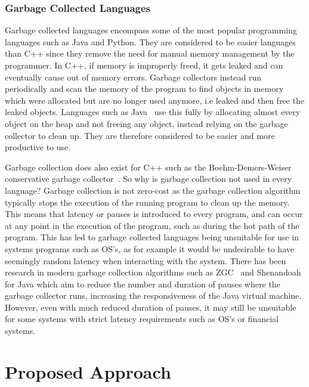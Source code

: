 \documentclass{proposal}
\begin{document}
    \subsubsection{Garbage Collected Languages}

    Garbage collected languages encompass some of the most popular programming languages such as Java and Python.
    They are considered to be easier languages than C++ since they remove the need for manual memory management by the programmer.
    In C++, if memory is improperly freed, it gets leaked and can eventually cause out of memory errors.
    Garbage collectors instead run periodically and scan the memory of the program to find objects in memory which were allocated but are no longer used anymore, i.e leaked and then free the leaked objects.
    Languages such as Java~\cite{Tauro2012} use this fully by allocating almost every object on the heap and not freeing any object, instead relying on the garbage collector to clean up.
    They are therefore considered to be easier and more productive to use.

    Garbage collection does also exist for C++ such as the Boehm-Demers-Weiser conservative garbage collector~\cite{boehm2002garbage}.
    So why is garbage collection not used in every language?
    Garbage collection is not zero-cost as the garbage collection algorithm typically stops the execution of the running program to clean up the memory.
    This means that latency or pauses is introduced to every program, and can occur at any point in the execution of the program, such as during the hot path of the program.
    This has led to garbage collected languages being unsuitable for use in systems programs such as OS's, as for example it would be undesirable to have seemingly random latency when interacting with the system.
    There has been research in modern garbage collection algorithms such as ZGC~\cite{ZGC} and Shenandoah~\cite{flood2016shenandoah} for Java which aim to reduce the number and duration of pauses where the garbage collector runs, increasing the responsiveness of the Java virtual machine.
    However, even with much reduced duration of pauses, it may still be unsuitable for some systems with strict latency requirements such as OS's or financial systems.




    \section{Proposed Approach}\label{sec:proposed-approach}
\end{document}
